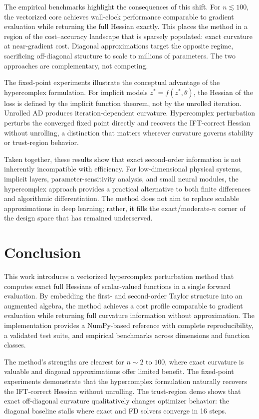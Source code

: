 \documentclass[11pt]{article}
\begin{document}
The empirical benchmarks highlight the consequences of this shift. For $n \lesssim
100$, the vectorized core achieves wall-clock performance comparable to gradient
evaluation while returning the full Hessian exactly. This places the method in a
region of the cost--accuracy landscape that is sparsely populated: exact curvature at
near-gradient cost. Diagonal approximations target the opposite regime, sacrificing
off-diagonal structure to scale to millions of parameters. The two approaches are
complementary, not competing.

The fixed-point experiments illustrate the conceptual advantage of the hypercomplex
formulation. For implicit models $z^* = f(z^*, \theta)$, the Hessian of the loss is
defined by the implicit function theorem, not by the unrolled iteration. Unrolled AD
produces iteration-dependent curvature. Hypercomplex perturbation perturbs the
converged fixed point directly and recovers the IFT-correct Hessian without
unrolling, a distinction that matters wherever curvature governs stability or
trust-region behavior.

Taken together, these results show that exact second-order information is not
inherently incompatible with efficiency. For low-dimensional physical systems, implicit
layers, parameter-sensitivity analysis, and small neural modules, the hypercomplex
approach provides a practical alternative to both finite differences and algorithmic
differentiation. The method does not aim to replace scalable approximations in deep
learning; rather, it fills the exact/moderate-$n$ corner of the design space that has
remained underserved.

\section{Conclusion}

This work introduces a vectorized hypercomplex perturbation method that computes exact
full Hessians of scalar-valued functions in a single forward evaluation. By embedding
the first- and second-order Taylor structure into an augmented algebra, the method
achieves a cost profile comparable to gradient evaluation while returning full
curvature information without approximation. The implementation provides a NumPy-based
reference with complete reproducibility, a validated test suite, and empirical
benchmarks across dimensions and function classes.

The method's strengths are clearest for $n \sim 2$ to $100$, where exact curvature is
valuable and diagonal approximations offer limited benefit. The fixed-point
experiments demonstrate that the hypercomplex formulation naturally recovers the
IFT-correct Hessian without unrolling. The trust-region demo shows that exact
off-diagonal curvature qualitatively changes optimizer behavior: the diagonal baseline
stalls where exact and FD solvers converge in 16 steps.
\end{document}
